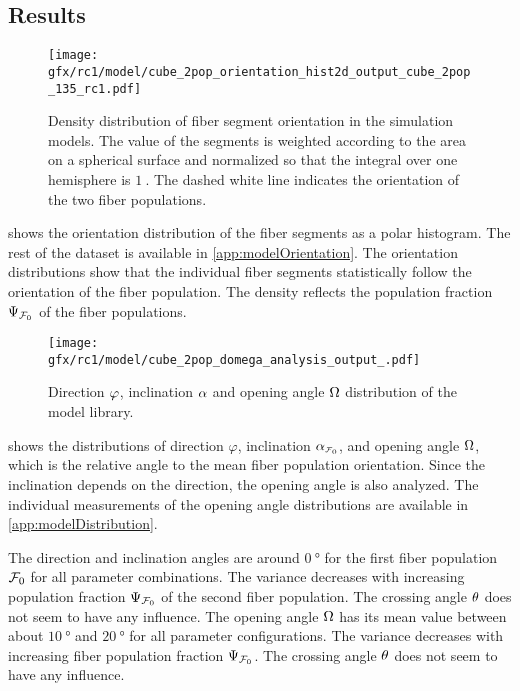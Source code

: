 \subsection{Results}
%
\begin{figure}[!t]
\centering
\texttt{[image: gfx/rc1/model/cube\_2pop\_orientation\_hist2d\_output\_cube\_2pop\_135\_rc1.pdf]}
\caption{Density distribution of fiber segment orientation in the simulation models.
The value of the segments is weighted according to the area on a spherical surface and normalized so that the integral over one hemisphere is $\SI{1}{}$.
The dashed white line indicates the orientation of the two fiber populations.}
\label{fig:modelOrientation}
\end{figure}
%
 shows the orientation distribution of the fiber segments as a polar histogram.
The rest of the dataset is available in \cref{app:modelOrientation}.
The orientation distributions show that the individual fiber segments statistically follow the orientation of the fiber population.
The density reflects the population fraction $\textnormal{$\Psi_{\textnormal{$\mathcal{F}_0$}}$}$ of the fiber populations.
\par
% 
\begin{figure}[!t]
    \centering
    \texttt{[image: gfx/rc1/model/cube\_2pop\_domega\_analysis\_output\_.pdf]}
    \caption{Direction $\textnormal{$\varphi$}$, inclination $\textnormal{$\alpha$}$ and opening angle $\textnormal{$\Omega$}$ distribution of the model library.}
    \label{fig:modelAngleBoxPlot}
\end{figure}
%
 shows the distributions of direction $\varphi$, inclination $\modelInc$, and opening angle $\textnormal{$\Omega$}$, which is the relative angle to the mean fiber population orientation.
Since the inclination depends on the direction, the opening angle is also analyzed.
The individual measurements of the opening angle distributions are available in \cref{app:modelDistribution}.
\par
% 
The direction and inclination angles are around $\SI{0}{\degree}$ for the first fiber population $\textnormal{$\mathcal{F}_0$}$ for all parameter combinations.
The variance decreases with increasing population fraction $\textnormal{$\Psi_{\textnormal{$\mathcal{F}_0$}}$}$ of the second fiber population.
The crossing angle $\textnormal{$\theta$}$ does not seem to have any influence.
The opening angle $\textnormal{$\Omega$}$ has its mean value between about $\SI{10}{\degree}$ and $\SI{20}{\degree}$ for all parameter configurations.
The variance decreases with increasing fiber population fraction $\textnormal{$\Psi_{\textnormal{$\mathcal{F}_0$}}$}$.
The crossing angle $\textnormal{$\theta$}$ does not seem to have any influence.
